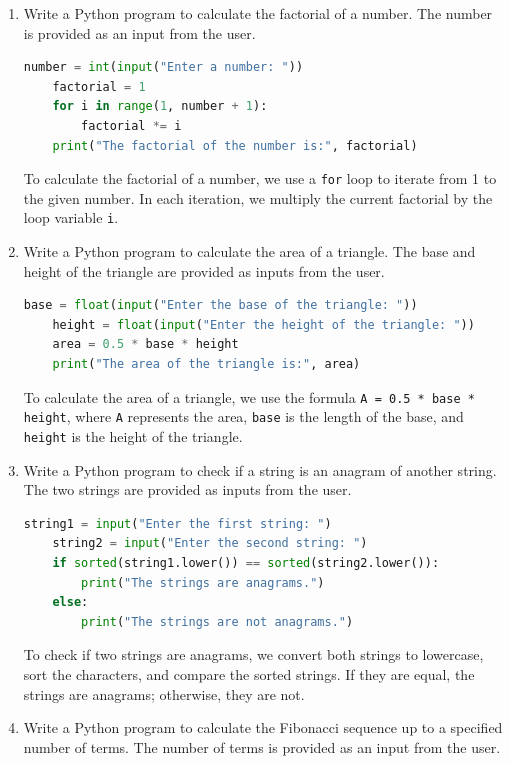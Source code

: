 \documentclass[12pt]{book}
\begin{document}
\begin{enumerate}
    \item Write a Python program to calculate the factorial of a number. The number is provided as an input from the user.

    \begin{lstlisting}[language=Python]
    number = int(input("Enter a number: "))
    factorial = 1
    for i in range(1, number + 1):
        factorial *= i
    print("The factorial of the number is:", factorial)
    \end{lstlisting}

    To calculate the factorial of a number, we use a \texttt{for} loop to iterate from 1 to the given number. In each iteration, we multiply the current factorial by the loop variable \texttt{i}.

\item Write a Python program to calculate the area of a triangle. The base and height of the triangle are provided as inputs from the user.
    
    \begin{lstlisting}[language=Python]
    base = float(input("Enter the base of the triangle: "))
    height = float(input("Enter the height of the triangle: "))
    area = 0.5 * base * height
    print("The area of the triangle is:", area)
    \end{lstlisting}
    
    To calculate the area of a triangle, we use the formula \texttt{A = 0.5 * base * height}, where \texttt{A} represents the area, \texttt{base} is the length of the base, and \texttt{height} is the height of the triangle.
    
    \item Write a Python program to check if a string is an anagram of another string. The two strings are provided as inputs from the user.
    
    \begin{lstlisting}[language=Python]
    string1 = input("Enter the first string: ")
    string2 = input("Enter the second string: ")
    if sorted(string1.lower()) == sorted(string2.lower()):
        print("The strings are anagrams.")
    else:
        print("The strings are not anagrams.")
    \end{lstlisting}
    
    To check if two strings are anagrams, we convert both strings to lowercase, sort the characters, and compare the sorted strings. If they are equal, the strings are anagrams; otherwise, they are not.
    
    \item Write a Python program to calculate the Fibonacci sequence up to a specified number of terms. The number of terms is provided as an input from the user.
    

\end{enumerate}
\end{document}
